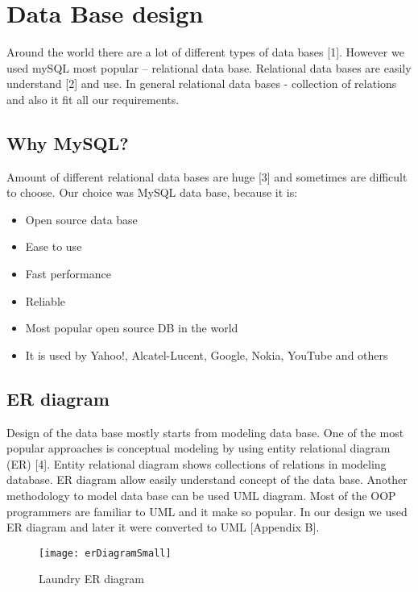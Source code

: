 %
\section{Data Base design}

Around the world there are a lot of different types of data bases [1]. However we used mySQL most popular – relational data base. Relational data bases are easily understand [2] and use. In general relational data bases - collection of relations and also it fit all our requirements.

\subsection{Why MySQL?}

Amount of different relational data bases are huge [3] and sometimes are difficult to choose. Our choice was MySQL data base, because it is:

\begin{itemize}
	\item Open source data base
	\item Ease to use
	\item Fast performance
	\item Reliable 
	\item Most popular open source DB in the world
	\item It is used by Yahoo!, Alcatel-Lucent, Google, Nokia, YouTube and others
\end{itemize}

\subsection{ER diagram}

Design of the data base mostly starts from modeling data base. One of the most popular approaches is conceptual modeling by using entity relational diagram (ER) [4]. Entity relational diagram shows collections of relations in modeling database. ER diagram allow easily understand concept of the data base. Another methodology to model data base can be used UML diagram. Most of the OOP programmers are familiar to UML and it make so popular. In our design we used ER diagram and later it were converted to UML [Appendix B].

\begin{figure}[h]
	\centering
		\texttt{[image: erDiagramSmall]}
	\caption{Laundry ER diagram}
	\label{fig:planning}
\end{figure}

